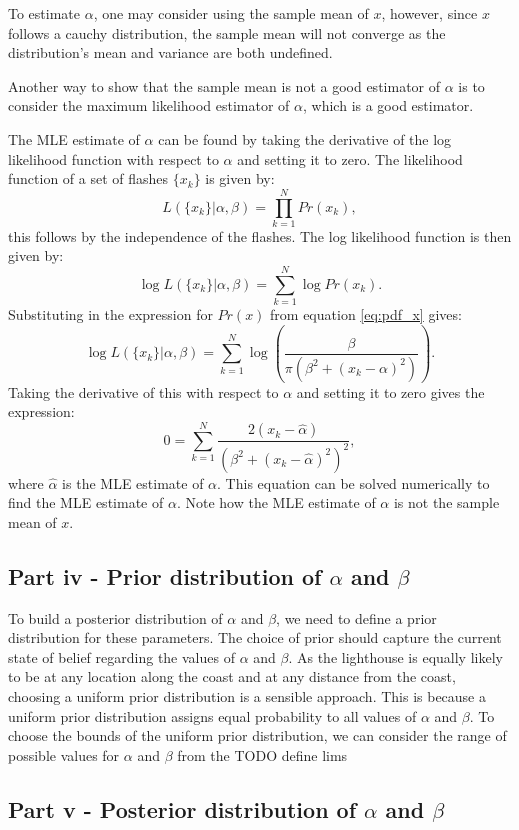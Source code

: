 \documentclass[11pt]{article}
\begin{document}
To estimate $\alpha$, one may consider using the sample mean of $x$, however, since $x$ follows a cauchy distribution, the sample mean will not converge as the distribution's mean and variance are both undefined.

Another way to show that the sample mean is not a good estimator of $\alpha$ is to consider the maximum likelihood estimator of $\alpha$, which is a good estimator.

The MLE estimate of $\alpha$ can be found by taking the derivative of the log likelihood function with respect to $\alpha$ and setting it to zero. The likelihood function of a set of flashes $\{x_k\}$ is given by:
\[
L(\{x_k\}|\alpha,\beta) = \prod_{k=1}^{N} Pr(x_k),
\] this follows by the independence of the flashes. The log likelihood function is then given by:
\[
\log L(\{x_k\}|\alpha,\beta) = \sum_{k=1}^{N} \log Pr(x_k).
\] Substituting in the expression for $Pr(x)$ from equation \ref{eq:pdf_x} gives:
\[
\log L(\{x_k\}|\alpha,\beta) = \sum_{k=1}^{N} \log \left( \frac{\beta}{\pi(\beta^2 + (x_k-\alpha)^2)} \right).
\]
Taking the derivative of this with respect to $\alpha$ and setting it to zero gives the expression:
\[
0 = \sum_{k=1}^{N} \frac{2(x_k-\hat\alpha)}{(\beta^2 + (x_k - \hat\alpha)^2)^2},
\] where $\hat\alpha$ is the MLE estimate of $\alpha$. This equation can be solved numerically to find the MLE estimate of $\alpha$. Note how the MLE estimate of $\alpha$ is not the sample mean of $x$.

\subsection{Part iv - Prior distribution of $\alpha$ and $\beta$}

To build a posterior distribution of $\alpha$ and $\beta$, we need to define a prior distribution for these parameters. The choice of prior should capture the current state of belief regarding the values of $\alpha$ and $\beta$. As the lighthouse is equally likely to be at any location along the coast and at any distance from the coast, choosing a uniform prior distribution is a sensible approach. This is because a uniform prior distribution assigns equal probability to all values of $\alpha$ and $\beta$.
To choose the bounds of the uniform prior distribution, we can consider the range of possible values for $\alpha$ and $\beta$ from the 
TODO define lims

\subsection{Part v - Posterior distribution of $\alpha$ and $\beta$}
\end{document}
